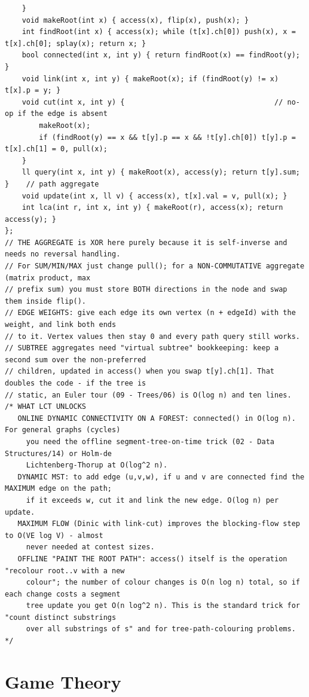 \documentclass[9pt,a4paper,twocolumn]{extarticle}
\begin{document}
\begin{lstlisting}
    }
    void makeRoot(int x) { access(x), flip(x), push(x); }
    int findRoot(int x) { access(x); while (t[x].ch[0]) push(x), x = t[x].ch[0]; splay(x); return x; }
    bool connected(int x, int y) { return findRoot(x) == findRoot(y); }
    void link(int x, int y) { makeRoot(x); if (findRoot(y) != x) t[x].p = y; }
    void cut(int x, int y) {                                   // no-op if the edge is absent
        makeRoot(x);
        if (findRoot(y) == x && t[y].p == x && !t[y].ch[0]) t[y].p = t[x].ch[1] = 0, pull(x);
    }
    ll query(int x, int y) { makeRoot(x), access(y); return t[y].sum; }    // path aggregate
    void update(int x, ll v) { access(x), t[x].val = v, pull(x); }
    int lca(int r, int x, int y) { makeRoot(r), access(x); return access(y); }
};
// THE AGGREGATE is XOR here purely because it is self-inverse and needs no reversal handling.
// For SUM/MIN/MAX just change pull(); for a NON-COMMUTATIVE aggregate (matrix product, max
// prefix sum) you must store BOTH directions in the node and swap them inside flip().
// EDGE WEIGHTS: give each edge its own vertex (n + edgeId) with the weight, and link both ends
// to it. Vertex values then stay 0 and every path query still works.
// SUBTREE aggregates need "virtual subtree" bookkeeping: keep a second sum over the non-preferred
// children, updated in access() when you swap t[y].ch[1]. That doubles the code - if the tree is
// static, an Euler tour (09 - Trees/06) is O(log n) and ten lines.
/* WHAT LCT UNLOCKS
   ONLINE DYNAMIC CONNECTIVITY ON A FOREST: connected() in O(log n). For general graphs (cycles)
     you need the offline segment-tree-on-time trick (02 - Data Structures/14) or Holm-de
     Lichtenberg-Thorup at O(log^2 n).
   DYNAMIC MST: to add edge (u,v,w), if u and v are connected find the MAXIMUM edge on the path;
     if it exceeds w, cut it and link the new edge. O(log n) per update.
   MAXIMUM FLOW (Dinic with link-cut) improves the blocking-flow step to O(VE log V) - almost
     never needed at contest sizes.
   OFFLINE "PAINT THE ROOT PATH": access() itself is the operation "recolour root..v with a new
     colour"; the number of colour changes is O(n log n) total, so if each change costs a segment
     tree update you get O(n log^2 n). This is the standard trick for "count distinct substrings
     over all substrings of s" and for tree-path-colouring problems. */
\end{lstlisting}

\section{Game Theory}
\end{document}
